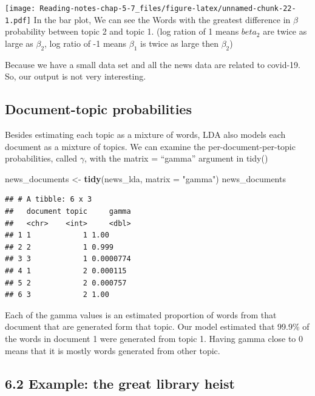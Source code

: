 \documentclass[]{article}
\newenvironment{Shaded}{\begin{snugshade}}{\end{snugshade}}
\newcommand{\DataTypeTok}[1]{\textcolor[rgb]{0.13,0.29,0.53}{#1}}
\newcommand{\KeywordTok}[1]{\textcolor[rgb]{0.13,0.29,0.53}{\textbf{#1}}}
\newcommand{\NormalTok}[1]{#1}
\newcommand{\StringTok}[1]{\textcolor[rgb]{0.31,0.60,0.02}{#1}}
\begin{document}
\texttt{[image: Reading-notes-chap-5-7\_files/figure-latex/unnamed-chunk-22-1.pdf]}
In the bar plot, We can see the Words with the greatest difference in
\(\beta\) probability between topic 2 and topic 1. (log ration of 1
means \(beta_2\) are twice as large as \(\beta_2\), log ratio of -1
means \(\beta_1\) is twice as large then \(\beta_2\))

Because we have a small data set and all the news data are related to
covid-19. So, our output is not very interesting.

\hypertarget{document-topic-probabilities}{%
\subsection{Document-topic
probabilities}\label{document-topic-probabilities}}

Besides estimating each topic as a mixture of words, LDA also models
each document as a mixture of topics. We can examine the
per-document-per-topic probabilities, called \(\gamma\), with the matrix
= ``gamma'' argument in tidy()

\begin{Shaded}
\begin{Highlighting}[]
\NormalTok{news_documents <-}\StringTok{ }\KeywordTok{tidy}\NormalTok{(news_lda, }\DataTypeTok{matrix =} \StringTok{"gamma"}\NormalTok{)}
\NormalTok{news_documents}
\end{Highlighting}
\end{Shaded}

\begin{verbatim}
## # A tibble: 6 x 3
##   document topic     gamma
##   <chr>    <int>     <dbl>
## 1 1            1 1.00     
## 2 2            1 0.999    
## 3 3            1 0.0000774
## 4 1            2 0.000115 
## 5 2            2 0.000757 
## 6 3            2 1.00
\end{verbatim}

Each of the gamma values is an estimated proportion of words from that
document that are generated form that topic. Our model estimated that
99.9\% of the words in document 1 were generated from topic 1. Having
gamma close to 0 means that it is mostly words generated from other
topic.

\hypertarget{example-the-great-library-heist}{%
\subsection{6.2 Example: the great library
heist}\label{example-the-great-library-heist}}
\end{document}
